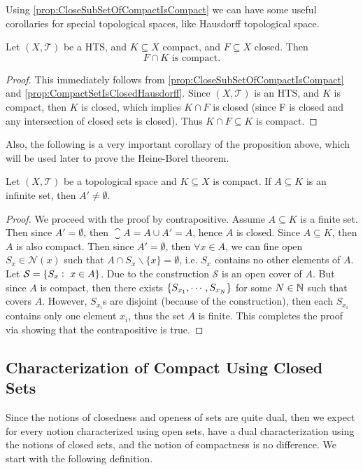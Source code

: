 Using \autoref{prop:CloseSubSetOfCompactIsCompact} we can have some useful corollaries for special topological spaces, like Hausdorff topological space. 

\begin{corollary}
	Let $(X,\mathcal{T})$ be a HTS, and $K \subseteq X$ compact, and $F \subseteq X$ closed. Then
	\[ F \cap K \text{ is compact}. \]
\end{corollary}
\begin{proof}
	This immediately follows from \autoref{prop:CloseSubSetOfCompactIsCompact} and \autoref{prop:CompactSetIsClosedHausdorff}. Since $(X,\mathcal{T})$ is an HTS, and $K$ is compact, then $K$ is closed, which implies $K\cap F$ is closed (since F is closed and any intersection of closed sets is closed). Thus $K \cap F \subseteq K$ is compact.  
\end{proof}

Also, the following is a very important corollary of the proposition above, which will be used later to prove the Heine-Borel theorem.

\begin{corollary}
	\label{cor:InfiniteSubsetOfCompactSetNotEmptDerSet}
	Let $(X,\mathcal{T})$ be a topological space and $K \subseteq X$ is compact. If $A \subseteq K$ is an infinite set, then $A' \neq \emptyset$.
\end{corollary}
\begin{proof}
	We proceed with the proof by contrapositive. Assume $A \subseteq K$ is a finite set. Then since $A' = \emptyset$, then $\closure A = A \cup A' = A$, hence $A$ is closed. Since $A \subseteq K$, then $A$ is also compact. Then since $A' = \emptyset$, then $\forall x \in A$, we can fine open $S_x \in \mathcal{N}(x)$ such that $A \cap S_x \backslash \{x\} = \emptyset$, i.e. $S_x$ contains no other elements of $A$. Let $\mathcal{S} = \{S_x:\ x \in A\}$. Due to the construction $\mathcal{S}$ is an open cover of $A$. But since $A$ is compact, then there exists $\{S_{x_1},\cdots,S_{x_N}\}$ for some $N \in \mathbb{N}$ such that covers $A$. However, $S_{x_i}$s are disjoint (because of the construction), then each $S_{x_i}$ contains only one element $x_i$, thus the set $A$ is finite. This completes the proof via showing that the contrapositive is true.
\end{proof}

\subsection{Characterization of Compact Using Closed Sets}
Since the notions of closedness and openess of sets are quite dual, then we expect for every notion characterized using open sets, have a dual characterization using the notions of closed sets, and the notion of compactness is no difference. We start with the following definition.

